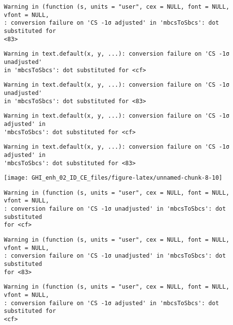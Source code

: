\documentclass[
  10pt,
  a4paper,oneside]{article}
\begin{document}
\begin{verbatim}
Warning in (function (s, units = "user", cex = NULL, font = NULL, vfont = NULL,
: conversion failure on 'CS -1σ adjusted' in 'mbcsToSbcs': dot substituted for
<83>
\end{verbatim}

\begin{verbatim}
Warning in text.default(x, y, ...): conversion failure on 'CS -1σ unadjusted'
in 'mbcsToSbcs': dot substituted for <cf>
\end{verbatim}

\begin{verbatim}
Warning in text.default(x, y, ...): conversion failure on 'CS -1σ unadjusted'
in 'mbcsToSbcs': dot substituted for <83>
\end{verbatim}

\begin{verbatim}
Warning in text.default(x, y, ...): conversion failure on 'CS -1σ adjusted' in
'mbcsToSbcs': dot substituted for <cf>
\end{verbatim}

\begin{verbatim}
Warning in text.default(x, y, ...): conversion failure on 'CS -1σ adjusted' in
'mbcsToSbcs': dot substituted for <83>
\end{verbatim}

\begin{center}\texttt{[image: GHI\_enh\_02\_ID\_CE\_files/figure-latex/unnamed-chunk-8-10]} \end{center}

\begin{verbatim}
Warning in (function (s, units = "user", cex = NULL, font = NULL, vfont = NULL,
: conversion failure on 'CS -1σ unadjusted' in 'mbcsToSbcs': dot substituted
for <cf>
\end{verbatim}

\begin{verbatim}
Warning in (function (s, units = "user", cex = NULL, font = NULL, vfont = NULL,
: conversion failure on 'CS -1σ unadjusted' in 'mbcsToSbcs': dot substituted
for <83>
\end{verbatim}

\begin{verbatim}
Warning in (function (s, units = "user", cex = NULL, font = NULL, vfont = NULL,
: conversion failure on 'CS -1σ adjusted' in 'mbcsToSbcs': dot substituted for
<cf>
\end{verbatim}
\end{document}
